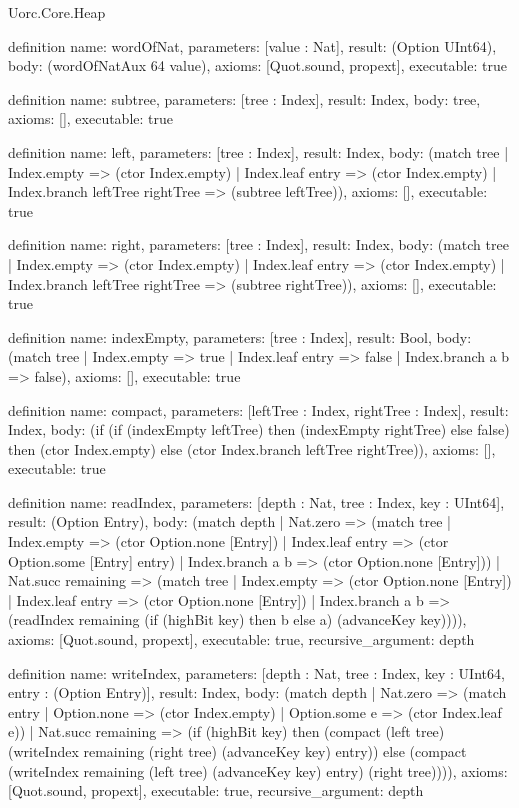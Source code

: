 \begin{lexlean}{Uorc.Core.Heap}
\begin{semanticmodule}
definition{
  name: wordOfNat,
  parameters: [value : Nat],
  result: (Option UInt64),
  body: (wordOfNatAux 64 value),
  axioms: [Quot.sound, propext],
  executable: true
}

definition{
  name: subtree,
  parameters: [tree : Index],
  result: Index,
  body: tree,
  axioms: [],
  executable: true
}

definition{
  name: left,
  parameters: [tree : Index],
  result: Index,
  body: (match tree
    | Index.empty => (ctor Index.empty)
    | Index.leaf entry => (ctor Index.empty)
    | Index.branch leftTree rightTree => (subtree leftTree)),
  axioms: [],
  executable: true
}

definition{
  name: right,
  parameters: [tree : Index],
  result: Index,
  body: (match tree
    | Index.empty => (ctor Index.empty)
    | Index.leaf entry => (ctor Index.empty)
    | Index.branch leftTree rightTree => (subtree rightTree)),
  axioms: [],
  executable: true
}

definition{
  name: indexEmpty,
  parameters: [tree : Index],
  result: Bool,
  body: (match tree | Index.empty => true | Index.leaf entry => false | Index.branch a b => false),
  axioms: [],
  executable: true
}

definition{
  name: compact,
  parameters: [leftTree : Index, rightTree : Index],
  result: Index,
  body: (if (if (indexEmpty leftTree) then (indexEmpty rightTree) else false) then (ctor Index.empty) else (ctor Index.branch leftTree rightTree)),
  axioms: [],
  executable: true
}

definition{
  name: readIndex,
  parameters: [depth : Nat, tree : Index, key : UInt64],
  result: (Option Entry),
  body: (match depth
    | Nat.zero => (match tree
      | Index.empty => (ctor Option.none [Entry])
      | Index.leaf entry => (ctor Option.some [Entry] entry)
      | Index.branch a b => (ctor Option.none [Entry]))
    | Nat.succ remaining => (match tree
      | Index.empty => (ctor Option.none [Entry])
      | Index.leaf entry => (ctor Option.none [Entry])
      | Index.branch a b => (readIndex remaining (if (highBit key) then b else a) (advanceKey key)))),
  axioms: [Quot.sound, propext],
  executable: true,
  recursive_argument: depth
}

definition{
  name: writeIndex,
  parameters: [depth : Nat, tree : Index, key : UInt64, entry : (Option Entry)],
  result: Index,
  body: (match depth
    | Nat.zero => (match entry
      | Option.none => (ctor Index.empty)
      | Option.some e => (ctor Index.leaf e))
    | Nat.succ remaining => (if (highBit key) then (compact (left tree) (writeIndex remaining (right tree) (advanceKey key) entry)) else (compact (writeIndex remaining (left tree) (advanceKey key) entry) (right tree)))),
  axioms: [Quot.sound, propext],
  executable: true,
  recursive_argument: depth
}


\end{semanticmodule}
\end{lexlean}
